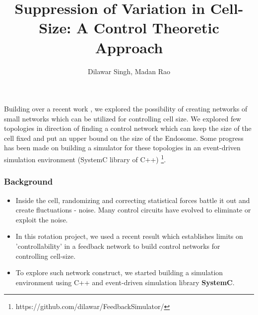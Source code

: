 \documentclass{beamer}
\title{Suppression of Variation in Cell-Size: A Control Theoretic Approach}
\author{Dilawar Singh, Madan Rao}
\begin{document}
\begin{frame}

    \maketitle

    Building over a recent work \cite{paulsson}, we explored the possibility of
    creating networks of small networks which can be utilized for controlling
    cell size. We explored few  topologies in direction of finding a control
    network which can keep the size of the cell fixed and put an upper bound on
    the size of the Endosome. Some progress has been made on building a
    simulator for these topologies in an event-driven simulation environment
    (SystemC library of C++)
    \footnote{https://github.com/dilawar/FeedbackSimulator/}.

\end{frame}

\begin{frame}
    \frametitle{Background}

    \begin{itemize} 
        \item Inside the cell, randomizing and correcting statistical forces
            battle it out and create fluctuations - noise. Many control
            circuits have evolved to eliminate or exploit the noise.  

        \item In this rotation project, we used a recent result \cite{paulsson}
            which establishes limits on 'controllability' in a feedback network
            to build control networks for controlling cell-size.

        \item To explore such network construct, we started building a
            simulation environment using C++ and event-driven simulation library
            \textbf{SystemC}.

    \end{itemize}

    
\end{frame}
\end{document}

